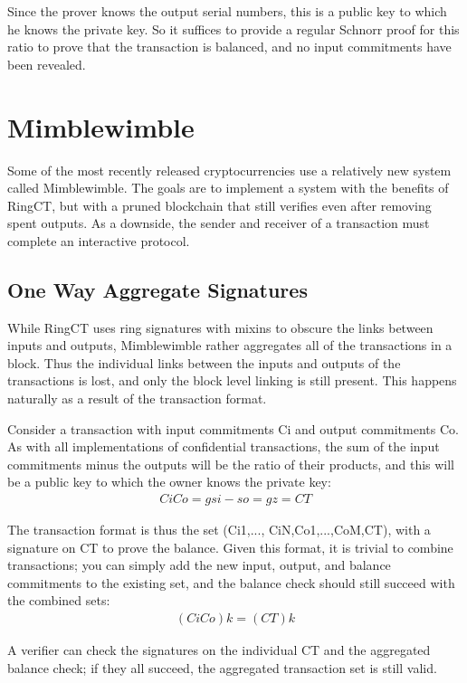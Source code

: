 \documentclass{article}
\begin{document}
Since the prover knows the output serial numbers, this is a public key to which he knows the private key.  So it suffices to provide a regular Schnorr proof for this ratio to prove that the transaction is balanced, and no input commitments have been revealed.



\section{Mimblewimble}

Some of the most recently released cryptocurrencies use a relatively new system called Mimblewimble.  The goals are to implement a system with the benefits of RingCT, but with a pruned blockchain that still verifies even after removing spent outputs.  As a downside, the sender and receiver of a transaction must complete an interactive protocol.


\subsection{One Way Aggregate Signatures}

While RingCT uses ring signatures with mixins to obscure the links between inputs and outputs, Mimblewimble rather aggregates all of the transactions in a block.  Thus the individual links between the inputs and outputs of the transactions is lost, and only the block level linking is still present.  This happens naturally as a result of the transaction format.

Consider a transaction with input commitments Ci and output commitments Co.  As with all implementations of confidential transactions, the sum of the input commitments minus the outputs will be the ratio of their products, and this will be a public key to which the owner knows the private key:
\begin{eqnarray}
  Ci Co=g si -  so=gz=CT
\end{eqnarray}

The transaction format is thus the set (Ci1,..., CiN,Co1,...,CoM,CT), with a signature on CT to prove the balance.  Given this format, it is trivial to combine transactions; you can simply add the new input, output, and balance commitments to the existing set, and the balance check should still succeed with the combined sets:
\begin{eqnarray}
  (  Ci Co)k= (CT)k
\end{eqnarray}

A verifier can check the signatures on the individual CT and the aggregated balance check; if they all succeed, the aggregated transaction set is still valid.
\end{document}
